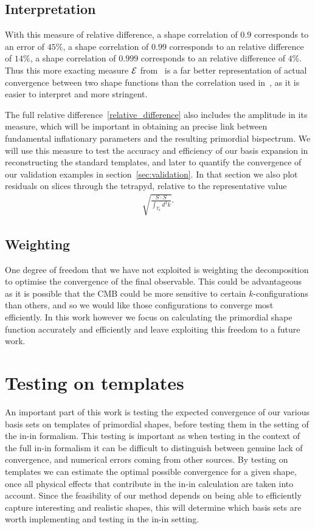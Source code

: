     \subsection{Interpretation}
With this measure of relative difference, a shape correlation of $0.9$ corresponds to an error of $45\%$,
a shape correlation of $0.99$ corresponds to an relative difference of $14\%$,
a shape correlation of $0.999$ corresponds to an relative difference of $4\%$.
Thus this more exacting measure $\mathcal{E}$ from~\cite{hung_1902} is a far better representation of actual convergence
between two shape functions
than the correlation used in~\cite{Funakoshi}, as it is easier to interpret and
more stringent.


The full relative difference~\eqref{relative_difference} also includes the amplitude
in its measure, which will be important in obtaining an precise link
between fundamental inflationary parameters and the resulting primordial bispectrum.
We will use this measure to test the accuracy and efficiency of our basis expansion
in reconstructing the standard templates, and later to quantify the convergence
of our validation examples in section~\ref{sec:validation}.
In that section we also plot residuals on slices through the tetrapyd,
relative to the representative value
\begin{align}\label{rep_val}
    \sqrt{\frac{S\cdot S}{\int_{T_k} d^3k}}.
\end{align}

    \subsection{Weighting}
    One degree of freedom that we have not exploited is weighting the decomposition
    to optimise the convergence of the final observable.
    This could be advantageous as it is possible that the CMB could be more sensitive
    to certain $k$-configurations than others, and so we would like those configurations to
    converge most efficiently.
    In this work however we focus on calculating the primordial shape function accurately
    and efficiently and leave exploiting this freedom to a future work.
\section{Testing on templates}
    An important part of this work is testing the expected convergence of our various
    basis sets on templates of primordial shapes, before testing them in the setting
    of the in-in formalism.
    This testing is important as when testing in the context of the full in-in formalism
    it can be difficult to distinguish between genuine lack of convergence, and
    numerical errors coming from other sources.
    By testing on templates we can estimate the optimal possible
    convergence for a given shape, once all physical effects that contribute
    in the in-in calculation are taken into account.
    Since the feasibility of our method depends on being able
    to efficiently capture interesting and realistic shapes, this will determine
    which basis sets are worth implementing and testing in the in-in setting.
